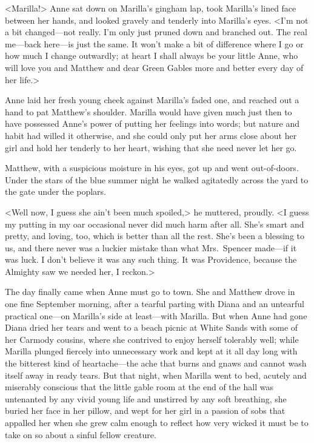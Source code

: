 <Marilla!> Anne sat down on Marilla's gingham lap, took Marilla's lined face between her hands, and looked gravely and tenderly into Marilla's eyes. <I'm not a bit changed—not really. I'm only just pruned down and branched out. The real me—back here—is just the same. It won't make a bit of difference where I go or how much I change outwardly; at heart I shall always be your little Anne, who will love you and Matthew and dear Green Gables more and better every day of her life.>

Anne laid her fresh young cheek against Marilla's faded one, and reached out a hand to pat Matthew's shoulder. Marilla would have given much just then to have possessed Anne's power of putting her feelings into words; but nature and habit had willed it otherwise, and she could only put her arms close about her girl and hold her tenderly to her heart, wishing that she need never let her go.

Matthew, with a suspicious moisture in his eyes, got up and went out-of-doors. Under the stars of the blue summer night he walked agitatedly across the yard to the gate under the poplars.

<Well now, I guess she ain't been much spoiled,> he muttered, proudly. <I guess my putting in my oar occasional never did much harm after all. She's smart and pretty, and loving, too, which is better than all the rest. She's been a blessing to us, and there never was a luckier mistake than what Mrs.~Spencer made—if it was luck. I don't believe it was any such thing. It was Providence, because the Almighty saw we needed her, I reckon.>

The day finally came when Anne must go to town. She and Matthew drove in one fine September morning, after a tearful parting with Diana and an untearful practical one—on Marilla's side at least—with Marilla. But when Anne had gone Diana dried her tears and went to a beach picnic at White Sands with some of her Carmody cousins, where she contrived to enjoy herself tolerably well; while Marilla plunged fiercely into unnecessary work and kept at it all day long with the bitterest kind of heartache—the ache that burns and gnaws and cannot wash itself away in ready tears. But that night, when Marilla went to bed, acutely and miserably conscious that the little gable room at the end of the hall was untenanted by any vivid young life and unstirred by any soft breathing, she buried her face in her pillow, and wept for her girl in a passion of sobs that appalled her when she grew calm enough to reflect how very wicked it must be to take on so about a sinful fellow creature.

